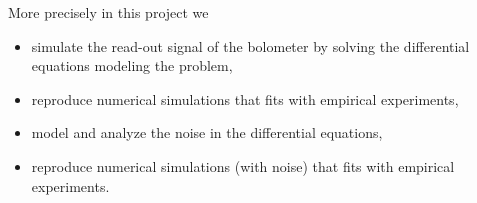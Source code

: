 More precisely in this project we
\begin{itemize}
 \item simulate the read-out signal of the bolometer by solving the differential equations modeling the problem,
 \item reproduce numerical simulations that fits with empirical experiments,
 \item model and analyze the noise in the differential equations,
 \item reproduce numerical simulations (with noise) that fits with empirical experiments.
\end{itemize}
